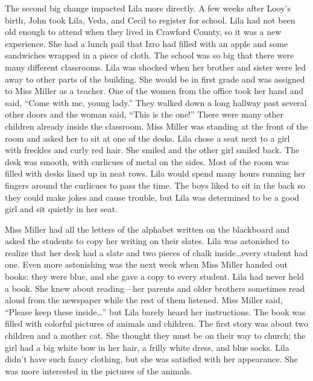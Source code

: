 \documentclass[
  letterpaper,
]{book}
\begin{document}
The second big change impacted Lila more directly. A few weeks after
Looy's birth, John took Lila, Veda, and Cecil to register for school.
Lila had not been old enough to attend when they lived in Crawford
County, so it was a new experience. She had a lunch pail that Izro had
filled with an apple and some sandwiches wrapped in a piece of cloth.
The school was so big that there were many different classrooms. Lila
was shocked when her brother and sister were led away to other parts of
the building. She would be in first grade and was assigned to Miss
Miller as a teacher. One of the women from the office took her hand and
said, ``Come with me, young lady.'' They walked down a long hallway past
several other doors and the woman said, ``This is the one!'' There were
many other children already inside the classroom. Miss Miller was
standing at the front of the room and asked her to sit at one of the
desks. Lila chose a seat next to a girl with freckles and curly red
hair. She smiled and the other girl smiled back. The desk was smooth,
with curlicues of metal on the sides. Most of the room was filled with
desks lined up in neat rows. Lila would spend many hours running her
fingers around the curlicues to pass the time. The boys liked to sit in
the back so they could make jokes and cause trouble, but Lila was
determined to be a good girl and sit quietly in her seat.

Miss Miller had all the letters of the alphabet written on the
blackboard and asked the students to copy her writing on their slates.
Lila was astonished to realize that her desk had a slate and two pieces
of chalk inside\ldots every student had one. Even more astonishing was
the next week when Miss Miller handed out books: they were blue, and she
gave a copy to every student. Lila had never held a book. She knew about
reading---her parents and older brothers sometimes read aloud from the
newspaper while the rest of them listened. Miss Miller said, ``Please
keep these inside\ldots{}'' but Lila barely heard her instructions. The
book was filled with colorful pictures of animals and children. The
first story was about two children and a mother cat. She thought they
must be on their way to church; the girl had a big white bow in her
hair, a frilly white dress, and blue socks. Lila didn't have such fancy
clothing, but she was satisfied with her appearance. She was more
interested in the pictures of the animals.
\end{document}
